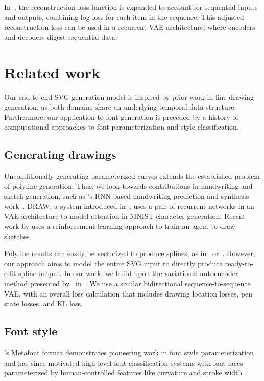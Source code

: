 In~\cite{graves2013generating}, the reconstruction loss function is expanded to account for sequential inputs and outputs, combining log loss for each item in the sequence.
This adjusted reconstruction loss can be used in a recurrent VAE architecture, where encoders and decoders digest sequential data.

\section{Related work}
Our end-to-end SVG generation model is inspired by prior work in line drawing generation, as both domains share an underlying temporal data structure.
Furthermore, our application to font generation is preceded by a history of computational approaches to font parameterization and style classification.

\subsection{Generating drawings}
Unconditionally generating parameterized curves extends the established problem of polyline generation.
Thus, we look towards contributions in handwriting and sketch generation, such as \citeauthor{graves2013generating}'s RNN-based handwriting prediction and synthesis work~\cite{graves2013generating}.
DRAW, a system introduced in~\cite{gregor2015draw}, uses a pair of recurrent networks in an VAE architecture to model attention in MNIST character generation.
Recent work by \citeauthor{ganin2017synthesizing} uses a reinforcement learning approach to train an agent to draw sketches~\cite{ganin2017synthesizing}.

Polyline results can easily be vectorized to produce splines, as in~\cite{janssen1997adaptive} or~\cite{birdal2014novel}.
However, our approach aims to model the entire SVG input to directly produce ready-to-edit spline output.
In our work, we build upon the variational autoencoder method presented by~\citeauthor{ha2017neural} in~\cite{ha2017neural}.
We use a similar bidirectional sequence-to-sequence VAE, with an overall loss calculation that includes drawing location losses, pen state losses, and KL loss.

\subsection{Font style}
\citeauthor{knuth1979tex}'s Metafont format demonstrates pioneering work in font style parameterization and has since motivated high-level font classification systems with font faces parameterized by human-controlled features like curvature and stroke width~\cite{knuth1979tex}\cite{lau2009learning}\cite{hassan2010next}.

